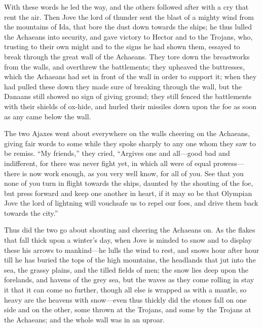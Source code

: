 With these words he led the way, and the others followed after with a cry
that rent the air. Then Jove the lord of thunder sent the blast of a
mighty wind from the mountains of Ida, that bore the dust down towards the
ships; he thus lulled the Achaeans into security, and gave victory to
Hector and to the Trojans, who, trusting to their own might and to the
signs he had shown them, essayed to break through the great wall of the
Achaeans. They tore down the breastworks from the walls, and overthrew the
battlements; they upheaved the buttresses, which the Achaeans had set in
front of the wall in order to support it; when they had pulled these down
they made sure of breaking through the wall, but the Danaans still showed
no sign of giving ground; they still fenced the battlements with their
shields of ox-hide, and hurled their missiles down upon the foe as soon as
any came below the wall.

The two Ajaxes went about everywhere on the walls cheering on the
Achaeans, giving fair words to some while they spoke sharply to any one
whom they saw to be remiss. “My friends,” they cried, “Argives one and all—good
bad and indifferent, for there was never fight yet, in which all were of
equal prowess—there is now work enough, as you very well know, for
all of you. See that you none of you turn in flight towards the ships,
daunted by the shouting of the foe, but press forward and keep one another
in heart, if it may so be that Olympian Jove the lord of lightning will
vouchsafe us to repel our foes, and drive them back towards the city.”

Thus did the two go about shouting and cheering the Achaeans on. As the
flakes that fall thick upon a winter’s day, when Jove is minded to snow
and to display these his arrows to mankind—he lulls the wind to
rest, and snows hour after hour till he has buried the tops of the high
mountains, the headlands that jut into the sea, the grassy plains, and the
tilled fields of men; the snow lies deep upon the forelands, and havens of
the grey sea, but the waves as they come rolling in stay it that it can
come no further, though all else is wrapped as with a mantle, so heavy are
the heavens with snow—even thus thickly did the stones fall on one
side and on the other, some thrown at the Trojans, and some by the Trojans
at the Achaeans; and the whole wall was in an uproar.

